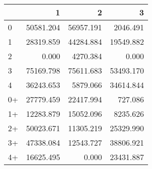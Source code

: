\begin{tabular}{lrrr}
\toprule
     &         1 &         2 &         3 \\
\midrule
 0   & \num{50581.204} & \num{56957.191} &  \num{2046.491} \\
 1   & \num{28319.859} & \num{44284.884} & \num{19549.882} \\
 2   &     \num{0.000} &  \num{4270.384} &     \num{0.000} \\
 3   & \num{75169.798} & \num{75611.683} & \num{53493.170} \\
 4   & \num{36243.653} &  \num{5879.066} & \num{34614.844} \\
 0+  & \num{27779.459} & \num{22417.994} &   \num{727.086} \\
 1+  & \num{12283.879} & \num{15052.096} &  \num{8235.626} \\
 2+  & \num{50023.671} & \num{11305.219} & \num{25329.990} \\
 3+  & \num{47338.084} & \num{12543.727} & \num{38806.921} \\
 4+  & \num{16625.495} &     \num{0.000} & \num{23431.887} \\
\bottomrule
\end{tabular}